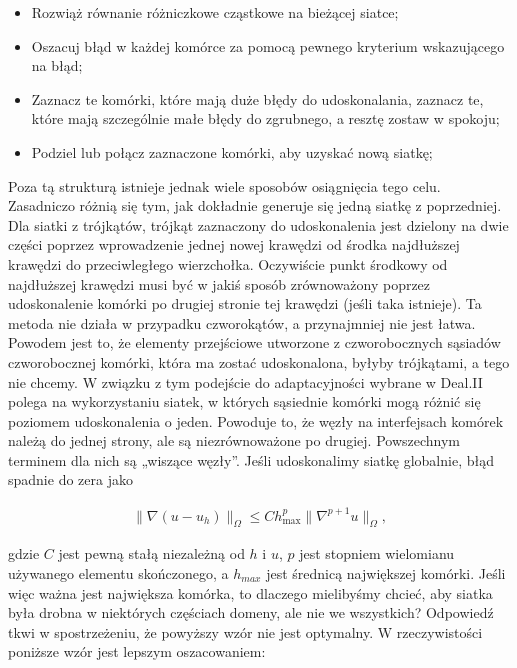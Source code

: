 \documentclass[]{pracamgr}
\begin{document}
        \begin{itemize}
          \item Rozwiąż równanie różniczkowe cząstkowe na bieżącej siatce;
          \item Oszacuj błąd w każdej komórce za pomocą pewnego kryterium wskazującego na błąd;
          \item Zaznacz te komórki, które mają duże błędy do udoskonalania, zaznacz te, które mają szczególnie małe błędy do zgrubnego, a resztę zostaw w spokoju;
          \item Podziel lub połącz zaznaczone komórki, aby uzyskać nową siatkę;
        \end{itemize}

        Poza tą strukturą istnieje jednak wiele sposobów osiągnięcia tego celu. Zasadniczo różnią się tym, jak dokładnie generuje się jedną siatkę z poprzedniej. Dla siatki z trójkątów, trójkąt zaznaczony do udoskonalenia jest dzielony na dwie części poprzez wprowadzenie jednej nowej krawędzi od środka najdłuższej krawędzi do przeciwległego wierzchołka. Oczywiście punkt środkowy od najdłuższej krawędzi musi być w jakiś sposób zrównoważony poprzez udoskonalenie komórki po drugiej stronie tej krawędzi (jeśli taka istnieje). Ta metoda nie działa w przypadku czworokątów, a przynajmniej nie jest łatwa. Powodem jest to, że elementy przejściowe utworzone z czworobocznych sąsiadów czworobocznej komórki, która ma zostać udoskonalona, byłyby trójkątami, a tego nie chcemy. W związku z tym podejście do adaptacyjności wybrane w Deal.II polega na wykorzystaniu siatek, w których sąsiednie komórki mogą różnić się poziomem udoskonalenia o jeden. Powoduje to, że węzły na interfejsach komórek należą do jednej strony, ale są niezrównoważone po drugiej. Powszechnym terminem dla nich są „wiszące węzły”. Jeśli udoskonalimy siatkę globalnie, błąd spadnie do zera jako

        \begin{align*}
          \|\nabla(u-u_h)\|_{\Omega} \le C h_\text{max}^p \| \nabla^{p+1} u \|_{\Omega},
        \end{align*}

        gdzie $C$ jest pewną stałą niezależną od $h$ i $u$, $p$ jest stopniem wielomianu używanego elementu skończonego, a $h_{max}$ jest średnicą największej komórki. Jeśli więc ważna jest największa komórka, to dlaczego mielibyśmy chcieć, aby siatka była drobna w niektórych częściach domeny, ale nie we wszystkich? Odpowiedź tkwi w spostrzeżeniu, że powyższy wzór nie jest optymalny. W rzeczywistości poniższe wzór jest lepszym oszacowaniem:
\end{document}
